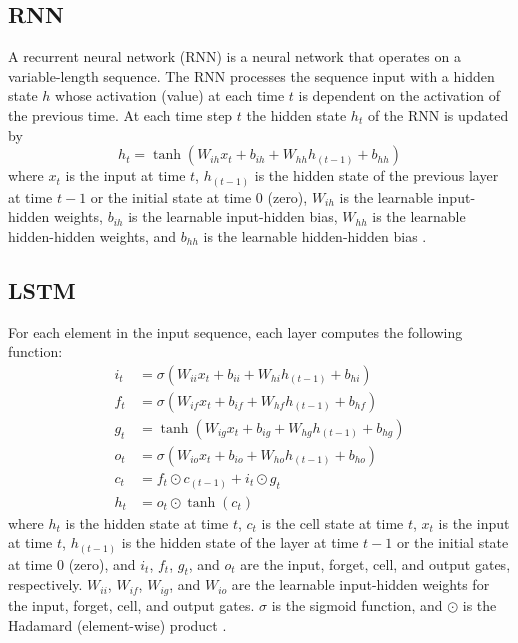 \subsection{RNN}
A recurrent neural network (RNN) is a neural network that operates on a variable-length sequence. The RNN processes the sequence input with a hidden state $h$ whose activation (value) at each time $t$ is dependent on the activation of the previous time. At each time step $t$ the hidden state $h_{t}$ of the RNN is updated by
\begin{equation} \label{eq:RNN}
	h_{t} = \tanh\left(W_{ih}x_{t} + b_{ih} + W_{hh}h_{\left(t-1\right)} + b_{hh}\right)
\end{equation}
where $x_{t}$ is the input at time $t$, $h_{\left(t-1\right)}$ is the hidden state of the previous layer at time $t-1$ or the initial state at time 0 (zero), $W_{ih}$ is the learnable input-hidden weights, $b_{ih}$ is the learnable input-hidden bias, $W_{hh}$ is the learnable hidden-hidden weights, and $b_{hh}$ is the learnable hidden-hidden bias \cite{NEURIPS2019_9015}.

\subsection{LSTM}
For each element in the input sequence, each layer computes the following function:
\begin{align}
	i_{t} &= \sigma\left(W_{ii}x_{t} + b_{ii} + W_{hi}h_{\left(t-1\right)} + b_{hi}\right) \label{eq:LSTM1} \\
	f_{t} &= \sigma\left(W_{if}x_{t} + b_{if} + W_{hf}h_{\left(t-1\right)} + b_{hf}\right) \label{eq:LSTM2} \\
	g_{t} &= \tanh\left(W_{ig}x_{t} + b_{ig} + W_{hg}h_{\left(t-1\right)} + b_{hg}\right) \label{eq:LSTM3} \\
	o_{t} &= \sigma\left(W_{io}x_{t} + b_{io} + W_{ho}h_{\left(t-1\right)} + b_{ho}\right) \label{eq:LSTM4} \\
	c_{t} &= f_{t} \odot c_{\left(t-1\right)} + i_{t} \odot g_{t} \label{eq:LSTM5} \\
	h_{t} &= o_{t} \odot \tanh\left(c_{t}\right) \label{eq:LSTM6}
\end{align}
where $h_{t}$ is the hidden state at time $t$, $c_{t}$ is the cell state at time $t$, $x_{t}$ is the input at time $t$, $h_{\left(t-1\right)}$ is the hidden state of the layer at time $t-1$ or the initial state at time 0 (zero), and $i_{t}$, $f_{t}$, $g_{t}$, and $o_{t}$ are the input, forget, cell, and output gates, respectively. $W_{ii}$, $W_{if}$, $W_{ig}$, and $W_{io}$ are the learnable input-hidden weights for the input, forget, cell, and output gates. $\sigma$ is the sigmoid function, and $\odot$ is the Hadamard (element-wise) product \cite{NEURIPS2019_9015}.

